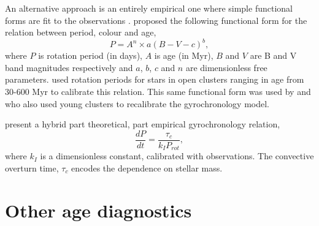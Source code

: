 An alternative approach is an entirely empirical one where simple functional
forms are fit to the observations \citep[\eg][]{Barnes2007, Mamajek2008,
Meibom2010}.
\citet{Barnes2003} proposed the following functional form for the relation
between period, colour and age, \begin{equation} \label{eq:Barnes2007_2} P =
A^n \times a(B-V-c)^b, \end{equation} where $P$ is rotation period (in days),
$A$ is age (in Myr), $B$ and $V$ are B and V band magnitudes respectively and
$a$, $b$, $c$ and $n$ are dimensionless free parameters.
\citet{Barnes2007} used rotation periods for stars in open clusters ranging in
age from 30-600 Myr to calibrate this relation.
This same functional form was used by \citet{Mamajek2008} and
\citet{Meibom2010} who also used young clusters to recalibrate the
gyrochronology model.

\citet{Barnes2010b} present a hybrid part theoretical, part empirical
gyrochronology relation,
\begin{equation}
\frac{dP}{dt} = \frac{\tau_c}{k_IP_{rot}},
\end{equation}
where $k_I$ is a dimensionless constant, calibrated with observations.
The convective overturn time, $\tau_c$ encodes the dependence on stellar mass.

\section{Other age diagnostics}

